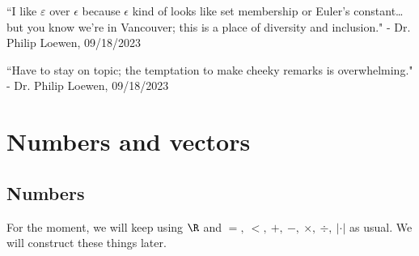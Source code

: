 \clearpage

\begin{nquote}{}
	``I like \(\varepsilon\) over \(\epsilon\) because \(\epsilon\) kind of looks like set membership or Euler's constant\dots but you know we're in Vancouver; this is a place of diversity and inclusion." - Dr. Philip Loewen, 09/18/2023
	
	\medskip
	
	``Have to stay on topic; the temptation to make cheeky remarks is overwhelming." - Dr. Philip Loewen, 09/18/2023
\end{nquote}

\section{Numbers and vectors}
\subsection{Numbers}
\begin{note}
	For the moment, we will keep using \(\R\) and \(=,~<,~+,~-,~\times,~\div,~|\cdot|\) as usual. We will construct these things later.
\end{note}

